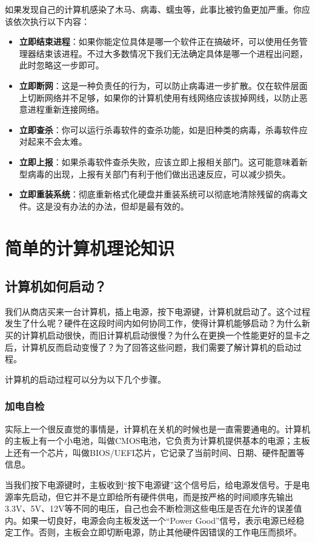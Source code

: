 如果发现自己的计算机感染了木马、病毒、蠕虫等，此事比被钓鱼更加严重。你应该依次执行以下内容：

\begin{itemize}
  \item \textbf{立即结束进程}：如果你能定位具体是哪一个软件正在搞破坏，可以使用任务管理器结束该进程。不过大多数情况下我们无法确定具体是哪一个进程出问题，此时忽略这一步即可。
  \item \textbf{立即断网}：这是一种负责任的行为，可以防止病毒进一步扩散。仅在软件层面上切断网络并不足够，如果你的计算机使用有线网络应该拔掉网线，以防止恶意进程重新连接网络。
  \item \textbf{立即查杀}：你可以运行杀毒软件的查杀功能，如是旧种类的病毒，杀毒软件应对起来不会太难。
  \item \textbf{立即上报}：如果杀毒软件查杀失败，应该立即上报相关部门。这可能意味着新型病毒的出现，上报有关部门有利于他们做出迅速反应，可以减少损失。
  \item \textbf{立即重装系统}：彻底重新格式化硬盘并重装系统可以彻底地清除残留的病毒文件。这是没有办法的办法，但却是最有效的。
\end{itemize}

\section{简单的计算机理论知识}

\subsection{计算机如何启动？}

我们从商店买来一台计算机，插上电源，按下电源键，计算机就启动了。这个过程发生了什么呢？硬件在这段时间内如何协同工作，使得计算机能够启动？为什么新买的计算机启动很快，而旧计算机启动很慢？为什么在更换一个性能更好的显卡之后，计算机反而启动变慢了？为了回答这些问题，我们需要了解计算机的启动过程。

计算机的启动过程可以分为以下几个步骤。

\subsubsection{加电自检}

实际上一个很反直觉的事情是，计算机在关机的时候也是一直需要通电的。计算机的主板上有一个小电池，叫做CMOS电池，它负责为计算机提供基本的电源；主板上还有一个芯片，叫做BIOS/UEFI芯片，它记录了当前时间、日期、硬件配置等信息。

当我们按下电源键时，主板收到“按下电源键”这个信号后，给电源发信号。于是电源率先启动，但它并不是立即给所有硬件供电，而是按严格的时间顺序先输出3.3V、5V、12V等不同的电压，自己也会不断检测这些电压是否在允许的误差值内。如果一切良好，电源会向主板发送一个“Power Good”信号，表示电源已经稳定工作。否则，主板会立即切断电源，防止其他硬件因错误的工作电压而损坏。

